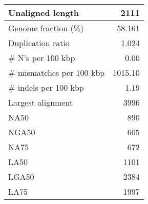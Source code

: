 \documentclass[12pt,a4paper]{article}
\begin{document}
\begin{table}[ht]
\begin{center}
\begin{tabular}{|l*{1}{|r}|}
Unaligned length & 2111 \\ \hline
Genome fraction (\%) & 58.161 \\ \hline
Duplication ratio & 1.024 \\ \hline
\# N's per 100 kbp & 0.00 \\ \hline
\# mismatches per 100 kbp & 1015.10 \\ \hline
\# indels per 100 kbp & 1.19 \\ \hline
Largest alignment & 3996 \\ \hline
NA50 & 890 \\ \hline
NGA50 & 605 \\ \hline
NA75 & 672 \\ \hline
LA50 & 1101 \\ \hline
LGA50 & 2384 \\ \hline
LA75 & 1997 \\ \hline
\end{tabular}
\end{center}
\end{table}
\end{document}
